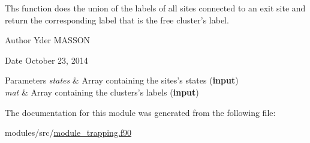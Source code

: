 \-Ths function does the union of the labels of all sites connected to an exit site and return the corresponding label that is the free cluster's label. 

\begin{DoxyAuthor}{\-Author}
\-Yder \-M\-A\-S\-S\-O\-N 
\end{DoxyAuthor}
\begin{DoxyDate}{\-Date}
\-October 23, 2014
\end{DoxyDate}

\begin{DoxyParams}{\-Parameters}
{\em states} & \-Array containing the sites's states ({\bfseries input}) \\
\hline
{\em mat} & \-Array containing the clusters's labels ({\bfseries input}) \\
\hline
\end{DoxyParams}


\-The documentation for this module was generated from the following file\-:\begin{DoxyCompactItemize}
\item 
modules/src/\hyperlink{module__trapping_8f90}{module\-\_\-trapping.\-f90}\end{DoxyCompactItemize}
